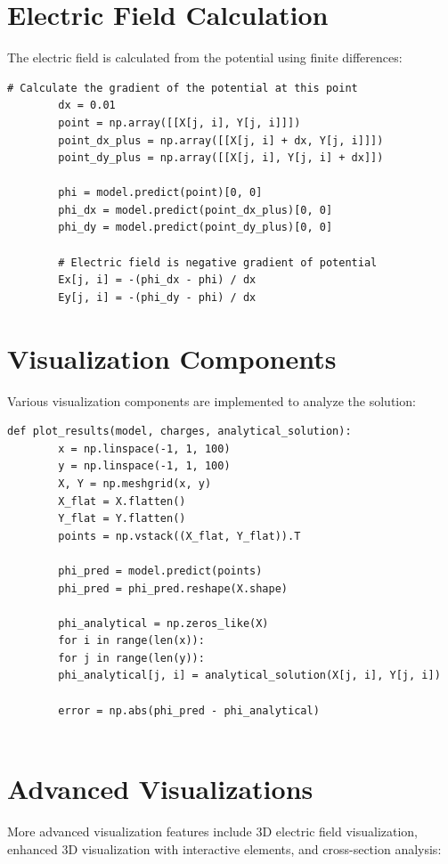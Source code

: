 \documentclass[12pt,a4paper]{report}
\begin{document}
	\section{Electric Field Calculation}
	The electric field is calculated from the potential using finite differences:
	
	\begin{lstlisting}[caption={Electric field calculation using finite differences}]
		# Calculate the gradient of the potential at this point
		dx = 0.01
		point = np.array([[X[j, i], Y[j, i]]])
		point_dx_plus = np.array([[X[j, i] + dx, Y[j, i]]])
		point_dy_plus = np.array([[X[j, i], Y[j, i] + dx]])
		
		phi = model.predict(point)[0, 0]
		phi_dx = model.predict(point_dx_plus)[0, 0]
		phi_dy = model.predict(point_dy_plus)[0, 0]
		
		# Electric field is negative gradient of potential
		Ex[j, i] = -(phi_dx - phi) / dx
		Ey[j, i] = -(phi_dy - phi) / dx
	\end{lstlisting}
	
	\section{Visualization Components}
	Various visualization components are implemented to analyze the solution:
	
	\begin{lstlisting}[caption={Basic visualization of potential and error}]
		def plot_results(model, charges, analytical_solution):
		x = np.linspace(-1, 1, 100)
		y = np.linspace(-1, 1, 100)
		X, Y = np.meshgrid(x, y)
		X_flat = X.flatten()
		Y_flat = Y.flatten()
		points = np.vstack((X_flat, Y_flat)).T
		
		phi_pred = model.predict(points)
		phi_pred = phi_pred.reshape(X.shape)
		
		phi_analytical = np.zeros_like(X)
		for i in range(len(x)):
		for j in range(len(y)):
		phi_analytical[j, i] = analytical_solution(X[j, i], Y[j, i])
		
		error = np.abs(phi_pred - phi_analytical)
		
	\end{lstlisting}
	
	\section{Advanced Visualizations}
	More advanced visualization features include 3D electric field visualization, enhanced 3D visualization with interactive elements, and cross-section analysis:
	
\end{document}

